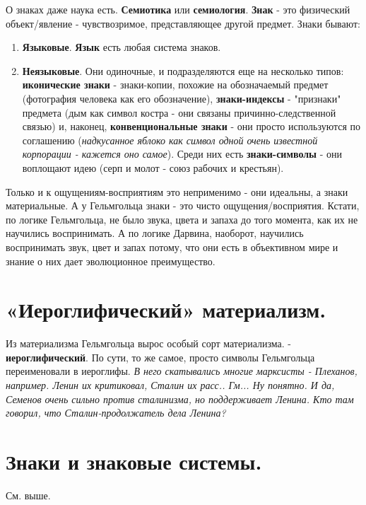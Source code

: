 О знаках даже наука есть. \textbf{Семиотика} или \textbf{семиология}. \textbf{Знак} - это физический объект/явление - чувствозримое, представляющее другой предмет. Знаки бывают:
\begin{enumerate}
\item \textbf{Языковые}. \textbf{Язык} есть любая система знаков.
\item \textbf{Неязыковые}. Они одиночные, и подразделяются еще на несколько типов: \textbf{иконические знаки} - знаки-копии, похожие на обозначаемый предмет (фотография человека как его обозначение), \textbf{знаки-индексы} - "признаки" предмета (дым как символ костра - они связаны причинно-следственной связью) и, наконец, \textbf{конвенциональные знаки} - они просто используются по соглашению (\textit{надкусанное яблоко как символ одной очень известной корпорации - кажется оно самое}). Среди них есть  \textbf{знаки-символы} - они воплощают идею (серп и молот - союз рабочих и крестьян). 
\end{enumerate} 

Только и к ощущениям-восприятиям это неприменимо - они идеальны, а знаки материальные. А у Гельмгольца знаки - это чисто ощущения/восприятия. Кстати, по логике Гельмгольца, не было звука, цвета и запаха до того момента, как их не научились воспринимать. А по логике Дарвина, наоборот, научились воспринимать звук, цвет и запах потому, что они есть в объективном мире и знание о них дает эволюционное преимущество. 

\section{ «Иероглифический» материализм.}
Из материализма Гельмгольца вырос особый сорт материализма. - \textbf{иероглифический}. По сути, то же самое, просто символы Гельмгольца переименовали в иероглифы. \textit{В него скатывались многие марксисты - Плеханов, например. Ленин их критиковал, Сталин их расс.. Гм... Ну понятно. И да, Семенов очень сильно против сталинизма, но поддерживает Ленина. Кто там говорил, что Сталин-продолжатель дела Ленина?}

\section{ Знаки и знаковые системы.}
См. выше.

